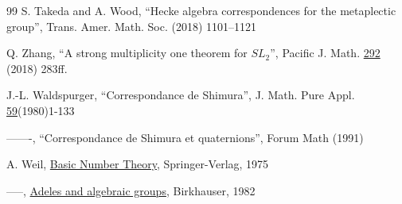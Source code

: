 \documentclass[12pt,letterpaper]{book}
\theoremstyle{plain}
\theoremstyle{definition}
\theoremstyle{remark}
\theoremstyle{remark}
\begin{document}
\begin{thebibliography}{99}
 S. Takeda and A. Wood, ``Hecke algebra correspondences
for the metaplectic group'', Trans. Amer. Math. Soc. 
(2018) 1101--1121

 Q. Zhang, ``A strong multiplicity one theorem for $SL_2$'',
Pacific J. Math. \underline{292} (2018) 283ff.

 J.-L. Waldspurger, ``Correspondance de Shimura'',
J. Math. Pure Appl. \underline{59}(1980)1-133

 -------, ``Correspondance de Shimura et quaternions'',
Forum Math (1991)

 A. Weil, \underline{Basic Number Theory},
Springer-Verlag, 1975

 -----, \underline{Adeles and algebraic groups},
Birkhauser, 1982


\end{thebibliography}
\end{document}
